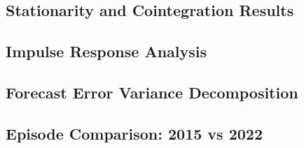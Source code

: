 \documentclass[12pt]{scrartcl}
\numberwithin{equation}{section}				%
\begin{document}
    \subsection{Stationarity and Cointegration Results}
    
    \subsection{Impulse Response Analysis}
    
    \subsection{Forecast Error Variance Decomposition}
    
    \subsection{Episode Comparison: 2015 vs 2022}
    
\end{document}
